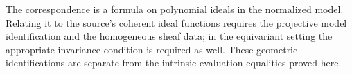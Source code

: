 \begin{remark}\label{projective:ideal-bridge-scope}
The correspondence is a formula on polynomial ideals in the normalized model.
Relating it to the source's coherent ideal functions requires the projective
model identification and the homogeneous sheaf data; in the equivariant setting
the appropriate invariance condition is required as well. These geometric
identifications are separate from the intrinsic evaluation equalities proved here.
\end{remark}
